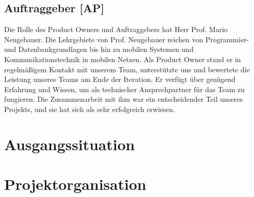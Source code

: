 \documentclass{article}
\begin{document}
\subsection{Auftraggeber [AP]}
    Die Rolle des Product Owners und Auftraggebers hat Herr Prof. Mario Neugebauer. Die Lehrgebiete von Prof. Neugebauer
    reichen von Programmier- und Datenbankgrundlagen bis hin zu mobilen Systemen und Kommunikationstechnik in 
    mobilen Netzen. Als Product Owner stand er in regelmäßigem Kontakt mit unserem Team, unterstützte uns und
    bewertete die Leistung unseres Teams am Ende der Iteration. Er verfügt über genügend Erfahrung und Wissen,
    um als technischer Ansprechpartner für das Team zu fungieren. Die Zusammenarbeit mit ihm war ein entscheidender Teil 
    unseres Projekts, und sie hat sich als sehr erfolgreich erwiesen.
\section{Ausgangssituation}
\section{Projektorganisation}
\newpage
\end{document}
